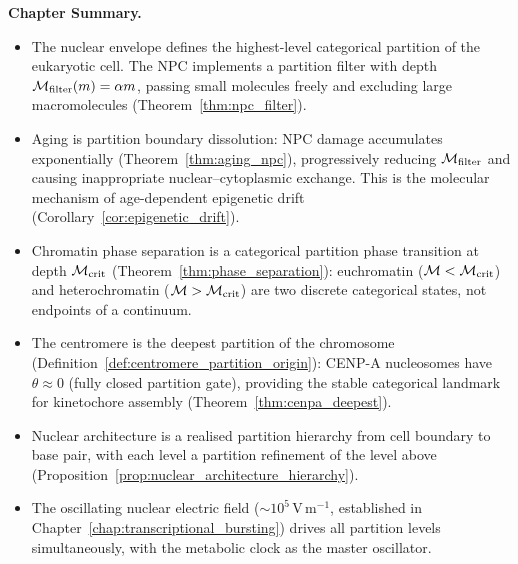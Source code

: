 \begin{chapterbox}
\textbf{Chapter Summary.}
\begin{itemize}
  \item The nuclear envelope defines the highest-level categorical partition
        of the eukaryotic cell. The NPC implements a partition filter with
        depth $\mathcal{M}_{\mathrm{filter}}(m) = \alpha m$, passing small
        molecules freely and excluding large macromolecules
        (Theorem~\ref{thm:npc_filter}).
  \item Aging is partition boundary dissolution: NPC damage accumulates
        exponentially (Theorem~\ref{thm:aging_npc}), progressively
        reducing $\mathcal{M}_{\mathrm{filter}}$ and causing inappropriate
        nuclear--cytoplasmic exchange. This is the molecular mechanism of
        age-dependent epigenetic drift (Corollary~\ref{cor:epigenetic_drift}).
  \item Chromatin phase separation is a categorical partition phase
        transition at depth $\mathcal{M}_{\mathrm{crit}}$
        (Theorem~\ref{thm:phase_separation}): euchromatin
        ($\mathcal{M} < \mathcal{M}_{\mathrm{crit}}$) and heterochromatin
        ($\mathcal{M} > \mathcal{M}_{\mathrm{crit}}$) are two discrete categorical states,
        not endpoints of a continuum.
  \item The centromere is the deepest partition of the chromosome
        (Definition~\ref{def:centromere_partition_origin}): CENP-A
        nucleosomes have $\theta \approx 0$ (fully closed partition gate),
        providing the stable categorical landmark for kinetochore assembly
        (Theorem~\ref{thm:cenpa_deepest}).
  \item Nuclear architecture is a realised partition hierarchy from cell
        boundary to base pair, with each level a partition refinement of
        the level above (Proposition~\ref{prop:nuclear_architecture_hierarchy}).
  \item The oscillating nuclear electric field ($\sim 10^5$\,V\,m$^{-1}$,
        established in Chapter~\ref{chap:transcriptional_bursting}) drives
        all partition levels simultaneously, with the metabolic clock
        as the master oscillator.
\end{itemize}
\end{chapterbox}
